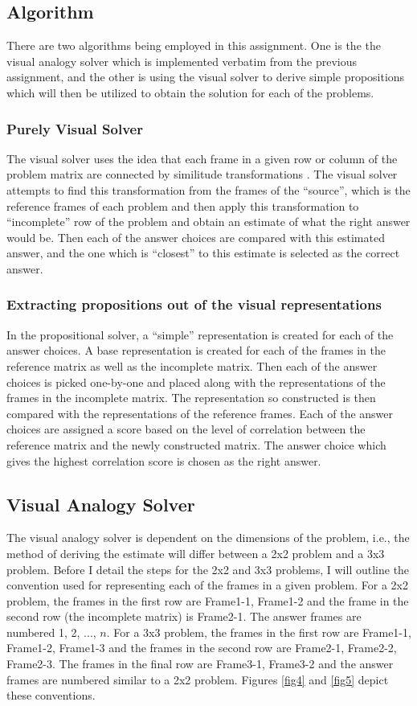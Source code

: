 \documentclass[10pt, letter]{article}
\begin{document}
\subsection*{Algorithm}
There are two algorithms being employed in this assignment. One is the the visual analogy solver which is implemented verbatim from the previous assignment, and the other is using the visual solver to derive simple propositions which will then be utilized to obtain the solution for each of the problems. 

\subsubsection*{Purely Visual Solver}
The visual solver uses the idea that each frame in a given row or column of the problem matrix are connected by similitude transformations \cite{paper}. The visual solver attempts to find this transformation from the frames of the ``source'', which is the reference frames of each problem and then apply this transformation to ``incomplete'' row of the problem and obtain an estimate of what the right answer would be. Then each of the answer choices are compared with this estimated answer, and the one which is ``closest'' to this estimate is selected as the correct answer.

\subsubsection*{Extracting propositions out of the visual representations}
In the propositional solver, a ``simple'' representation is created for each of the answer choices. A base representation is created for each of the frames in the reference matrix as well as the incomplete matrix. Then each of the answer choices is picked one-by-one and placed along with the representations of the frames in the incomplete matrix. The representation so constructed is then compared with the representations of the reference frames. Each of the answer choices are assigned a score based on the level of correlation between the reference matrix and the newly constructed matrix. The answer choice which gives the highest correlation score is chosen as the right answer.

\subsection*{Visual Analogy Solver}
The visual analogy solver is dependent on the dimensions of the problem, i.e., the method of deriving the estimate will differ between a 2x2 problem and a 3x3 problem. Before I detail the steps for the 2x2 and 3x3 problems, I will outline the convention used for representing each of the frames in a given problem. For a 2x2 problem, the frames in the first row are Frame1-1, Frame1-2 and the frame in the second row (the incomplete matrix) is Frame2-1. The answer frames are numbered 1, 2, ..., $n$. For a 3x3 problem, the frames in the first row are Frame1-1, Frame1-2, Frame1-3 and the frames in the second row are Frame2-1, Frame2-2, Frame2-3. The frames in the final row are Frame3-1, Frame3-2 and the answer frames are numbered similar to a 2x2 problem. Figures \ref{fig4} and \ref{fig5} depict these conventions.
\end{document}
